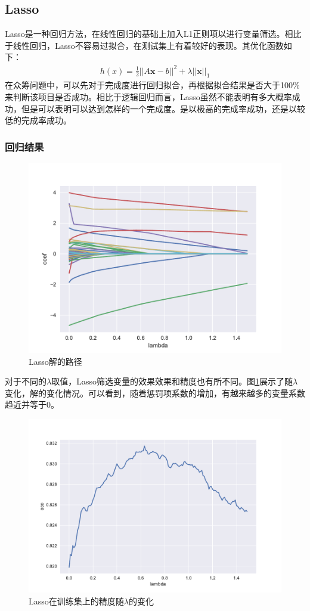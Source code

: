 \documentclass[lang=cn,a4paper]{elegantpaper}
\begin{document}
\subsection{Lasso}
Lasso是一种回归方法，在线性回归的基础上加入L1正则项以进行变量筛选。相比于线性回归，Lasso不容易过拟合，在测试集上有着较好的表现。其优化函数如下：
\begin{align*}
h(x) = \frac{1}{2}\vert\vert A\mathbf{x}-b\vert\vert^2 + \lambda\vert\vert \mathbf{x}\vert\vert_1
\end{align*}
在众筹问题中，可以先对于完成度进行回归拟合，再根据拟合结果是否大于100\%来判断该项目是否成功。相比于逻辑回归而言，Lasso虽然不能表明有多大概率成功，但是可以表明可以达到怎样的一个完成度。是以极高的完成率成功，还是以较低的完成率成功。

\subsubsection{回归结果}
\begin{figure}[!htbp]
  \centering
  \includegraphics[width=0.8\linewidth]{image/解的路径.pdf}
  \caption{Lasso解的路径}
  \label{fig:解的路径}
\end{figure}
对于不同的$\lambda$取值，Lasso筛选变量的效果效果和精度也有所不同。图\ref{fig:解的路径}展示了随$\lambda$变化，解的变化情况。可以看到，随着惩罚项系数的增加，有越来越多的变量系数趋近并等于0。
\begin{figure}[!htbp]
  \centering
  \includegraphics[width=0.8\linewidth]{image/lasoo_acc.pdf}
  \caption{Lasso在训练集上的精度随$\lambda$的变化}
  \label{fig:lasso acc}
\end{figure}
\end{document}
